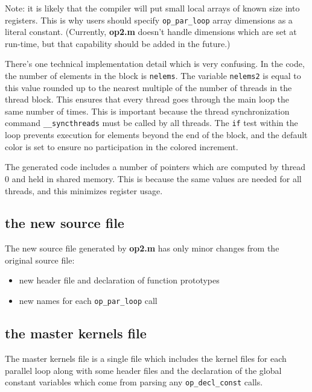 \documentclass[12pt]{article}
\begin{document}

Note: it is likely that the compiler will put small local arrays of 
known size into registers.  This is why users should specify
{\tt op\_par\_loop} array dimensions as a literal constant.
(Currently, {\bf op2.m} doesn't handle dimensions which are set at 
run-time, but that capability should be added in the future.)

There's one technical implementation detail which is very confusing.
In the code, the number of elements in the block is {\tt nelems}.
The variable {\tt nelems2} is equal to this value rounded up to the 
nearest multiple of the number of threads in the thread block.
This ensures that every thread goes through the main loop the same 
number of times.  This is important because the thread synchronization 
command {\tt \_\_syncthreads} must be called by all threads.
The {\tt if} test within the loop prevents execution for elements
beyond the end of the block, and the default color is set to ensure
no participation in the colored increment.

The generated code includes a number of pointers which are computed 
by thread 0 and held in shared memory.  This is because the same values 
are needed for all threads, and this minimizes register usage.


\subsection{the new source file}

The new source file generated by {\bf op2.m} has only minor changes 
from the original source file:
\begin{itemize}
\item
new header file and declaration of function prototypes

\item
new names for each {\tt op\_par\_loop} call
\end{itemize}

\subsection{the master kernels file}

The master kernels file is a single file which includes the kernel 
files for each parallel loop along with some header files and the 
declaration of the global constant variables which come from parsing 
any {\tt op\_decl\_const} calls.
\end{document}
